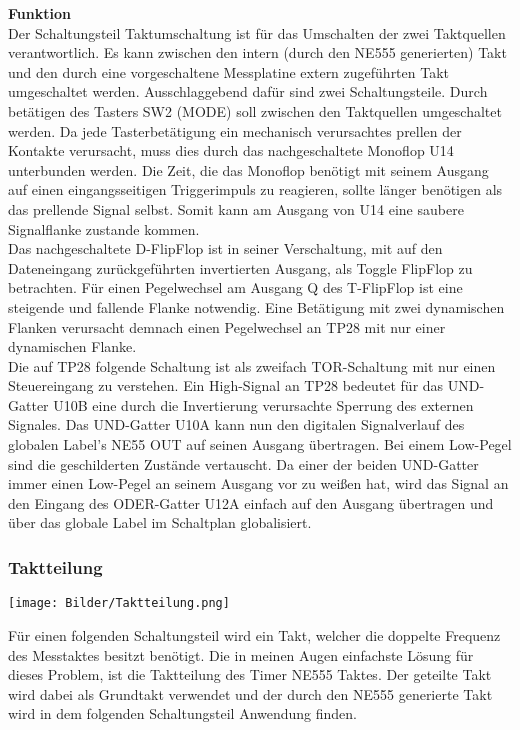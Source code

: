 \documentclass[a4paper,11pt]{scrartcl}
\begin{document}
\textbf{Funktion}
\\
Der Schaltungsteil \glqq Taktumschaltung \grqq{} ist für das Umschalten der zwei Taktquellen verantwortlich. Es kann zwischen den intern (durch den NE555 generierten) Takt und den durch eine vorgeschaltene Messplatine extern zugeführten Takt umgeschaltet werden. Ausschlaggebend dafür sind zwei Schaltungsteile. Durch betätigen des Tasters SW2 (MODE) soll zwischen den Taktquellen umgeschaltet werden. Da jede Tasterbetätigung ein mechanisch verursachtes prellen der Kontakte verursacht, muss dies durch das nachgeschaltete  Monoflop U14 unterbunden werden. Die Zeit, die das Monoflop benötigt mit seinem Ausgang auf einen eingangsseitigen Triggerimpuls zu reagieren, sollte länger benötigen als das prellende Signal selbst. Somit kann am Ausgang von U14 eine saubere Signalflanke zustande kommen. 
\\
Das nachgeschaltete D-FlipFlop ist in seiner Verschaltung, mit auf den Dateneingang zurückgeführten invertierten Ausgang, als Toggle FlipFlop zu betrachten. Für einen Pegelwechsel am Ausgang Q des T-FlipFlop ist eine steigende und fallende Flanke notwendig. Eine Betätigung mit zwei dynamischen Flanken verursacht demnach einen Pegelwechsel an TP28 mit nur einer dynamischen Flanke. 
\\
Die auf TP28 folgende Schaltung ist als zweifach TOR-Schaltung mit nur einen Steuereingang zu verstehen. Ein High-Signal an TP28 bedeutet für das UND-Gatter U10B eine durch die Invertierung verursachte Sperrung des externen Signales. Das UND-Gatter U10A kann nun den digitalen Signalverlauf des globalen Label's \glqq NE55 OUT \grqq{} auf seinen Ausgang übertragen. Bei einem Low-Pegel sind die geschilderten Zustände vertauscht. Da einer der beiden UND-Gatter immer einen Low-Pegel an seinem Ausgang vor zu weißen hat, wird das Signal an den Eingang des ODER-Gatter U12A einfach auf den Ausgang übertragen und über das globale Label im Schaltplan globalisiert.

\subsubsection{Taktteilung}

\begin{center}
\texttt{[image: Bilder/Taktteilung.png]}
\end{center}

Für einen folgenden Schaltungsteil wird ein Takt, welcher die doppelte Frequenz des Messtaktes besitzt benötigt. Die in meinen Augen einfachste Lösung für dieses Problem, ist die Taktteilung des Timer NE555 Taktes. Der geteilte Takt wird dabei als Grundtakt verwendet und der durch den NE555 generierte Takt wird in dem folgenden Schaltungsteil Anwendung finden.
\end{document}
